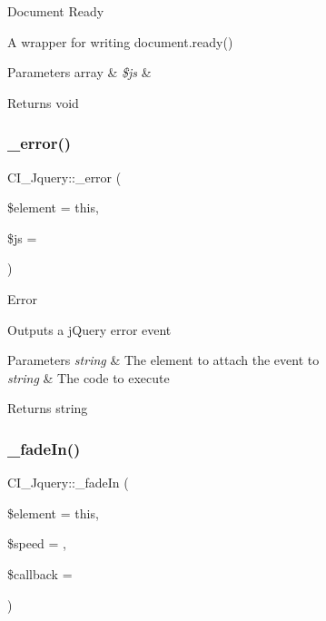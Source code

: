 Document Ready

A wrapper for writing document.\+ready()


\begin{DoxyParams}[1]{Parameters}
array & {\em \$js} & \\
\hline
\end{DoxyParams}
\begin{DoxyReturn}{Returns}
void 
\end{DoxyReturn}
\mbox{\label{class_c_i___jquery_af9e636fd7bfe3409cae73fbc5e21b223}} 
\subsubsection{\texorpdfstring{\+\_\+error()}{\_error()}}
{\footnotesize\ttfamily C\+I\+\_\+\+Jquery\+::\+\_\+error (\begin{DoxyParamCaption}\item[{}]{\$element = {\ttfamily \textquotesingle{}this\textquotesingle{}},  }\item[{}]{\$js = {\ttfamily \textquotesingle{}\textquotesingle{}} }\end{DoxyParamCaption})\hspace{0.3cm}{\ttfamily [protected]}}

Error

Outputs a j\+Query error event


\begin{DoxyParams}{Parameters}
{\em string} & The element to attach the event to \\
\hline
{\em string} & The code to execute \\
\hline
\end{DoxyParams}
\begin{DoxyReturn}{Returns}
string 
\end{DoxyReturn}
\mbox{\label{class_c_i___jquery_a03d20a752982eded76e0d8ff30d8e609}} 
\subsubsection{\texorpdfstring{\+\_\+fade\+In()}{\_fadeIn()}}
{\footnotesize\ttfamily C\+I\+\_\+\+Jquery\+::\+\_\+fade\+In (\begin{DoxyParamCaption}\item[{}]{\$element = {\ttfamily \textquotesingle{}this\textquotesingle{}},  }\item[{}]{\$speed = {\ttfamily \textquotesingle{}\textquotesingle{}},  }\item[{}]{\$callback = {\ttfamily \textquotesingle{}\textquotesingle{}} }\end{DoxyParamCaption})\hspace{0.3cm}{\ttfamily [protected]}}

